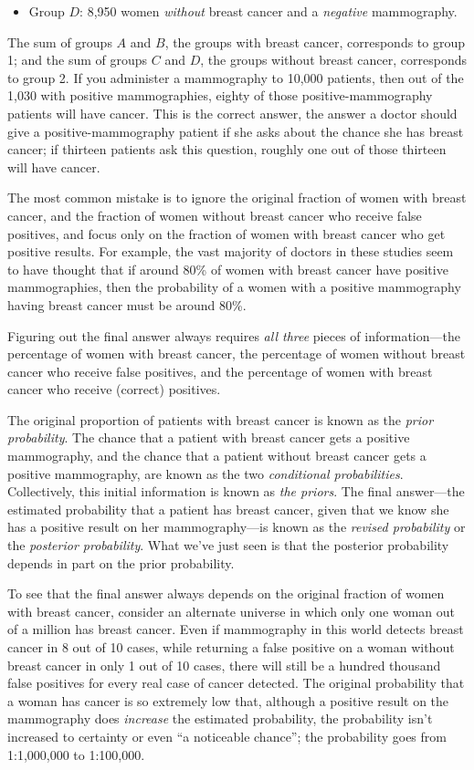 {\begin{itemize}
\item {
 Group $D$: 8,950 women \textit{without} breast cancer and a
 \textit{negative} mammography.}
\end{itemize}


 The sum of groups $A$ and $B$, the groups with breast cancer,
corresponds to group 1; and the sum of groups $C$ and $D$, the groups
without breast cancer, corresponds to group 2. If you administer a
mammography to 10,000 patients, then out of the 1,030 with positive
mammographies, eighty of those positive-mammography patients will have
cancer. This is the correct answer, the answer a doctor should give a
positive-mammography patient if she asks about the chance she has
breast cancer; if thirteen patients ask this question, roughly one out
of those thirteen will have cancer.

\hr


 The most common mistake is to ignore the original fraction of
women with breast cancer, and the fraction of women without breast
cancer who receive false positives, and focus only on the fraction of
women with breast cancer who get positive results. For example, the
vast majority of doctors in these studies seem to have thought that if
around 80\% of women with breast cancer have positive mammographies,
then the probability of a women with a positive mammography having
breast cancer must be around 80\%.


 Figuring out the final answer always requires \textit{all three}
pieces of information---the percentage of women with breast cancer, the
percentage of women without breast cancer who receive false positives,
and the percentage of women with breast cancer who receive (correct)
positives.


 The original proportion of patients with breast cancer is known as
the \textit{prior probability}. The chance that a patient with breast
cancer gets a positive mammography, and the chance that a patient
without breast cancer gets a positive mammography, are known as the two
\textit{conditional probabilities}. Collectively, this initial
information is known as \textit{the priors}. The final answer---the
estimated probability that a patient has breast cancer, given that we
know she has a positive result on her mammography---is known as the
\textit{revised probability} or the \textit{posterior probability}.
What we've just seen is that the posterior probability
depends in part on the prior probability.


 To see that the final answer always depends on the original
fraction of women with breast cancer, consider an alternate universe in
which only one woman out of a million has breast cancer. Even if
mammography in this world detects breast cancer in 8 out of 10 cases,
while returning a false positive on a woman without breast cancer in
only 1 out of 10 cases, there will still be a hundred thousand false
positives for every real case of cancer detected. The original
probability that a woman has cancer is so extremely low that, although
a positive result on the mammography does \textit{increase} the
estimated probability, the probability isn't increased
to certainty or even ``a noticeable
chance''; the probability goes from 1:1,000,000 to
1:100,000.


}
